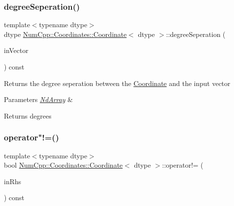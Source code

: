 \subsubsection{\texorpdfstring{degree\+Seperation()}{degreeSeperation()}\hspace{0.1cm}{\footnotesize\ttfamily [2/2]}}
{\footnotesize\ttfamily template$<$typename dtype$>$ \\
dtype \mbox{\hyperlink{class_num_cpp_1_1_coordinates_1_1_coordinate}{Num\+Cpp\+::\+Coordinates\+::\+Coordinate}}$<$ dtype $>$\+::degree\+Seperation (\begin{DoxyParamCaption}\item[{const \mbox{\hyperlink{class_num_cpp_1_1_nd_array}{Nd\+Array}}$<$ dtype $>$ \&}]{in\+Vector }\end{DoxyParamCaption}) const\hspace{0.3cm}{\ttfamily [inline]}}

Returns the degree seperation between the \mbox{\hyperlink{class_num_cpp_1_1_coordinates_1_1_coordinate}{Coordinate}} and the input vector


\begin{DoxyParams}{Parameters}
{\em \mbox{\hyperlink{class_num_cpp_1_1_nd_array}{Nd\+Array}}} & \\
\hline
\end{DoxyParams}
\begin{DoxyReturn}{Returns}
degrees 
\end{DoxyReturn}
\mbox{\label{class_num_cpp_1_1_coordinates_1_1_coordinate_a0dcc2f1285e939100e6e55d3fa6b1a61}} 
\subsubsection{\texorpdfstring{operator"!=()}{operator!=()}}
{\footnotesize\ttfamily template$<$typename dtype$>$ \\
bool \mbox{\hyperlink{class_num_cpp_1_1_coordinates_1_1_coordinate}{Num\+Cpp\+::\+Coordinates\+::\+Coordinate}}$<$ dtype $>$\+::operator!= (\begin{DoxyParamCaption}\item[{const \mbox{\hyperlink{class_num_cpp_1_1_coordinates_1_1_coordinate}{Coordinate}}$<$ dtype $>$ \&}]{in\+Rhs }\end{DoxyParamCaption}) const\hspace{0.3cm}{\ttfamily [inline]}}

